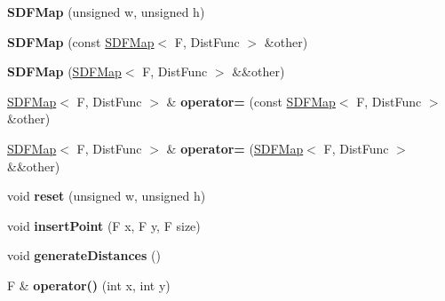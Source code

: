 \begin{DoxyCompactItemize}
\item 
\hypertarget{classSDFMap_acd15f041a9d13c05883280f006bbf3a9}{}{\bfseries S\+D\+F\+Map} (unsigned w, unsigned h)\label{classSDFMap_acd15f041a9d13c05883280f006bbf3a9}

\item 
\hypertarget{classSDFMap_a665cbf9306bc3e22f919995649864cdb}{}{\bfseries S\+D\+F\+Map} (const \hyperlink{classSDFMap}{S\+D\+F\+Map}$<$ F, Dist\+Func $>$ \&other)\label{classSDFMap_a665cbf9306bc3e22f919995649864cdb}

\item 
\hypertarget{classSDFMap_a5235326e01a16e5a7cfc67af7cab8cc1}{}{\bfseries S\+D\+F\+Map} (\hyperlink{classSDFMap}{S\+D\+F\+Map}$<$ F, Dist\+Func $>$ \&\&other)\label{classSDFMap_a5235326e01a16e5a7cfc67af7cab8cc1}

\item 
\hypertarget{classSDFMap_a5c4e78a7f94cb1e2bb36a5cf526532d9}{}\hyperlink{classSDFMap}{S\+D\+F\+Map}$<$ F, Dist\+Func $>$ \& {\bfseries operator=} (const \hyperlink{classSDFMap}{S\+D\+F\+Map}$<$ F, Dist\+Func $>$ \&other)\label{classSDFMap_a5c4e78a7f94cb1e2bb36a5cf526532d9}

\item 
\hypertarget{classSDFMap_a63dbf729487b7fc20933b7fc9a17a7cf}{}\hyperlink{classSDFMap}{S\+D\+F\+Map}$<$ F, Dist\+Func $>$ \& {\bfseries operator=} (\hyperlink{classSDFMap}{S\+D\+F\+Map}$<$ F, Dist\+Func $>$ \&\&other)\label{classSDFMap_a63dbf729487b7fc20933b7fc9a17a7cf}

\item 
\hypertarget{classSDFMap_a3287b18c857506f2d5bc79d21643a47e}{}void {\bfseries reset} (unsigned w, unsigned h)\label{classSDFMap_a3287b18c857506f2d5bc79d21643a47e}

\item 
\hypertarget{classSDFMap_a3f927d9b7cd05720615ffdbcdb3839af}{}void {\bfseries insert\+Point} (F x, F y, F size)\label{classSDFMap_a3f927d9b7cd05720615ffdbcdb3839af}

\item 
\hypertarget{classSDFMap_a10e73a99bcb54c1d68b39274965ee73a}{}void {\bfseries generate\+Distances} ()\label{classSDFMap_a10e73a99bcb54c1d68b39274965ee73a}

\item 
\hypertarget{classSDFMap_a4176c98b581d2dec99baf34774a6d6e2}{}F \& {\bfseries operator()} (int x, int y)\label{classSDFMap_a4176c98b581d2dec99baf34774a6d6e2}


\end{DoxyCompactItemize}
